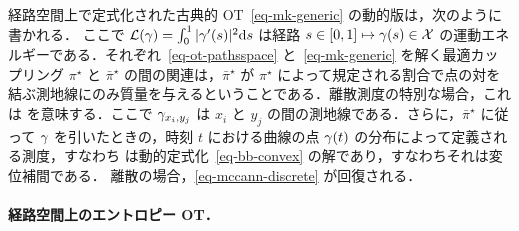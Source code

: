 経路空間上で定式化された古典的 OT~\eqref{eq-mk-generic} の動的版は，次のように書かれる．
ここで $\mathcal{L}(\gamma) = \int_0^1 |\gamma'(s)|^2 \mathrm{d} s$ は経路 $s \in [0,1] \mapsto \gamma(s) \in \mathcal{X}$ の運動エネルギーである．それぞれ~\eqref{eq-ot-pathsspace} と~\eqref{eq-mk-generic} を解く最適カップリング $\pi^\star$ と $\bar\pi^\star$ の間の関連は，$\bar\pi^\star$ が $\pi^\star$ によって規定される割合で点の対を結ぶ測地線にのみ質量を与えるということである．離散測度の特別な場合，これは
を意味する．ここで $\gamma_{x_i,y_j}$ は $x_i$ と $y_j$ の間の測地線である．さらに，$\bar\pi^\star$ に従って $\gamma$ を引いたときの，時刻 $t$ における曲線の点 $\gamma(t)$ の分布によって定義される測度，すなわち
は動的定式化~\eqref{eq-bb-convex} の解であり，すなわちそれは変位補間である．
%
離散の場合，\eqref{eq-mccann-discrete} が回復される．

\paragraph{経路空間上のエントロピー OT．}

